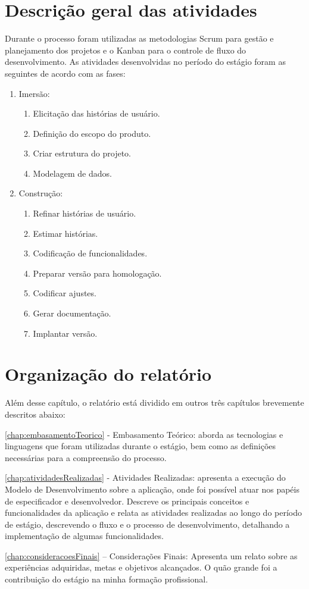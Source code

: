 \section{Descrição geral das atividades}
\label{sec:descricaoGeralAtividades}
Durante o processo foram utilizadas as metodologias Scrum para gestão e planejamento dos projetos e o Kanban para o controle de fluxo do desenvolvimento. As atividades desenvolvidas no período do estágio foram as seguintes de acordo com as fases: 
\begin{enumerate}
    \item Imersão:
    \begin{enumerate}
        \item Elicitação das histórias de usuário.
        \item Definição do escopo do produto.
        \item Criar estrutura do projeto.
        \item Modelagem de dados.
    \end{enumerate}
   \item Construção:
   \begin{enumerate}
        \item Refinar histórias de usuário.
        \item Estimar histórias.
        \item Codificação de funcionalidades.
        \item Preparar versão para homologação.
        \item Codificar ajustes.
        \item Gerar documentação.
        \item Implantar versão.
   \end{enumerate}
\end{enumerate}

\section{Organização do relatório}
\label{sec:organizacaoRelatorio}
Além desse capítulo, o relatório está dividido em outros três capítulos brevemente descritos abaixo:

\autoref{chap:embasamentoTeorico} - Embasamento Teórico: aborda as tecnologias e linguagens que foram utilizadas durante o estágio, bem como as definições necessárias para a compreensão do processo.

\autoref{chap:atividadesRealizadas} - Atividades Realizadas: apresenta a execução do Modelo de Desenvolvimento sobre a aplicação, onde foi possível atuar nos papéis de especificador e desenvolvedor. Descreve os principais conceitos e funcionalidades da aplicação e relata as atividades realizadas ao longo do período de estágio, descrevendo o fluxo e o processo de desenvolvimento, detalhando a implementação de algumas funcionalidades.

\autoref{chap:consideracoesFinais} – Considerações Finais: Apresenta um relato sobre as experiências adquiridas, metas e objetivos alcançados. O quão grande foi a contribuição do estágio na minha formação profissional.
